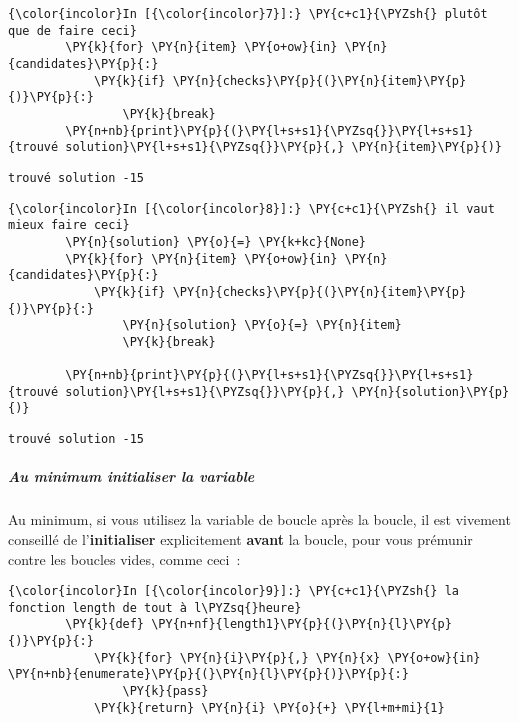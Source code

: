    \begin{Verbatim}[commandchars=\\\{\}]
{\color{incolor}In [{\color{incolor}7}]:} \PY{c+c1}{\PYZsh{} plutôt que de faire ceci}
        \PY{k}{for} \PY{n}{item} \PY{o+ow}{in} \PY{n}{candidates}\PY{p}{:}
            \PY{k}{if} \PY{n}{checks}\PY{p}{(}\PY{n}{item}\PY{p}{)}\PY{p}{:}
                \PY{k}{break}
        \PY{n+nb}{print}\PY{p}{(}\PY{l+s+s1}{\PYZsq{}}\PY{l+s+s1}{trouvé solution}\PY{l+s+s1}{\PYZsq{}}\PY{p}{,} \PY{n}{item}\PY{p}{)}
\end{Verbatim}


    \begin{Verbatim}[commandchars=\\\{\}]
trouvé solution -15

    \end{Verbatim}

    \begin{Verbatim}[commandchars=\\\{\}]
{\color{incolor}In [{\color{incolor}8}]:} \PY{c+c1}{\PYZsh{} il vaut mieux faire ceci}
        \PY{n}{solution} \PY{o}{=} \PY{k+kc}{None}
        \PY{k}{for} \PY{n}{item} \PY{o+ow}{in} \PY{n}{candidates}\PY{p}{:}
            \PY{k}{if} \PY{n}{checks}\PY{p}{(}\PY{n}{item}\PY{p}{)}\PY{p}{:}
                \PY{n}{solution} \PY{o}{=} \PY{n}{item}
                \PY{k}{break}
        
        \PY{n+nb}{print}\PY{p}{(}\PY{l+s+s1}{\PYZsq{}}\PY{l+s+s1}{trouvé solution}\PY{l+s+s1}{\PYZsq{}}\PY{p}{,} \PY{n}{solution}\PY{p}{)}
\end{Verbatim}


    \begin{Verbatim}[commandchars=\\\{\}]
trouvé solution -15

    \end{Verbatim}

    \hypertarget{au-minimum-initialiser-la-variable}{%
\subparagraph{Au minimum initialiser la
variable}\label{au-minimum-initialiser-la-variable}}

    Au minimum, si vous utilisez la variable de boucle après la boucle, il
est vivement conseillé de l'\textbf{initialiser} explicitement
\textbf{avant} la boucle, pour vous prémunir contre les boucles vides,
comme ceci~:

    \begin{Verbatim}[commandchars=\\\{\}]
{\color{incolor}In [{\color{incolor}9}]:} \PY{c+c1}{\PYZsh{} la fonction length de tout à l\PYZsq{}heure}
        \PY{k}{def} \PY{n+nf}{length1}\PY{p}{(}\PY{n}{l}\PY{p}{)}\PY{p}{:}
            \PY{k}{for} \PY{n}{i}\PY{p}{,} \PY{n}{x} \PY{o+ow}{in} \PY{n+nb}{enumerate}\PY{p}{(}\PY{n}{l}\PY{p}{)}\PY{p}{:}
                \PY{k}{pass}
            \PY{k}{return} \PY{n}{i} \PY{o}{+} \PY{l+m+mi}{1}
\end{Verbatim}


